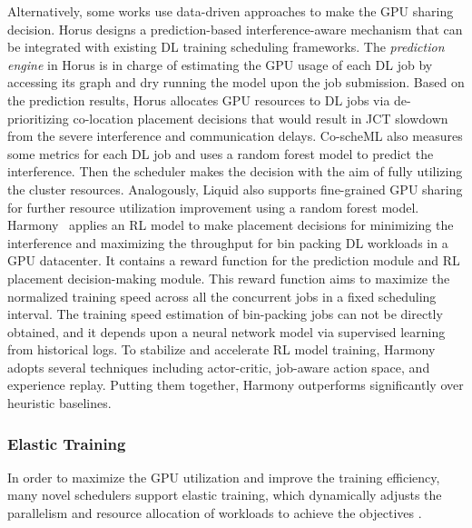 Alternatively, some works use data-driven approaches to make the GPU sharing decision. Horus \cite{Horus, Yeung} designs a prediction-based interference-aware mechanism that can be integrated with existing DL training scheduling frameworks. The \emph{prediction engine} in Horus is in charge of estimating the GPU usage of each DL job by accessing its graph and dry running the model upon the job submission. Based on the prediction results, Horus allocates GPU resources to DL jobs via de-prioritizing co-location placement decisions that would result in JCT slowdown from the severe interference and communication delays. Co-scheML \cite{Co-scheML} also measures some metrics for each DL job and uses a random forest model to predict the interference. Then the scheduler makes the decision with the aim of fully utilizing the cluster resources. Analogously, Liquid \cite{Liquid} also supports fine-grained GPU sharing for further resource utilization improvement using a random forest model. Harmony~\cite{Harmony} applies an RL model to make placement decisions for minimizing the interference and maximizing the throughput for bin packing DL workloads in a GPU datacenter. It contains a reward function for the prediction module and RL placement decision-making module. This reward function aims to maximize the normalized training speed across all the concurrent jobs in a fixed scheduling interval. The training speed estimation of bin-packing jobs can not be directly obtained, and it depends upon a neural network model via supervised learning from historical logs. To stabilize and accelerate RL model training, Harmony adopts several techniques including actor-critic, job-aware action space, and experience replay. Putting them together, Harmony outperforms significantly over heuristic baselines.




\subsubsection{Elastic Training}


In order to maximize the GPU utilization and improve the training efficiency, many novel schedulers support elastic training, which dynamically adjusts the parallelism and resource allocation of workloads to achieve the objectives {\tiny{}} {\tiny{}}. 

